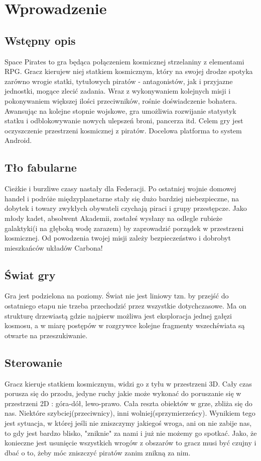 \chapter{Wprowadzenie}

\section{Wstępny opis}
Space Pirates to gra będąca połączeniem kosmicznej strzelaniny z elementami RPG. Gracz kierujew niej statkiem kosmicznym, który na swojej drodze spotyka zarówno wrogie statki, tytułowych piratów - antagonistów, jak i przyjazne jednostki, mogące zlecić zadania. Wraz z wykonywaniem kolejnych misji i pokonywaniem większej ilości przeciwników, rośnie doświadczenie bohatera. Awansując na kolejne stopnie wojskowe, gra umożliwia rozwijanie statystyk statku i odblokowywanie nowych ulepszeń broni, pancerza itd. Celem gry jest oczyszczenie przestrzeni kosmicznej z piratów. Docelowa platforma to system Android.

\section{Tło fabularne}
Cieżkie i burzliwe czasy nastały dla Federacji. Po ostatniej wojnie domowej handel i podróże międzyplanetarne stały się dużo bardziej niebezpieczne, na dobytek i towary zwykłych obywateli czychają piraci i grupy przestępcze. Jako młody kadet, absolwent Akademii, zostałeś wysłany na odlegle rubieże galaktyki(i na głęboką wodę zarazem) by zaprowadzić porządek w przestrzeni kosmicznej. Od powodzenia twojej misji zależy bezpieczeństwo i dobrobyt mieszkańców układów Carbona!

\section{Świat gry}
Gra jest podzielona na poziomy. Świat nie jest liniowy tzn. by przejść do ostatniego etapu nie trzeba przechodzić przez wszystkie dotychczasowe. Ma on strukturę drzewiastą gdzie najpierw możliwa jest eksploracja jednej gałęzi kosmosu, a w miarę postępów w rozgrywce kolejne fragmenty wszechświata są otwarte na przeszukiwanie.

\section{Sterowanie}
Gracz kieruje statkiem kosmicznym, widzi go z tyłu w przestrzeni 3D. Cały czas porusza się do przodu, jedyne ruchy jakie może wykonać do poruszanie się w przestrzeni 2D : góra-dół, lewo-prawo. Cała reszta obiektów w grze, zbliża się do nas. Niektóre szybciej(przeciwnicy), inni wolniej(sprzymierzeńcy). Wynikiem tego jest sytuacja, w której jeśli nie zniszczymy jakiegoś wroga, ani on nie zabije nas, to gdy jest bardzo blisko, "zniknie" za nami i już nie możemy go spotkać. Jako, że konieczne jest usunięcie wszystkich wrogów z obszarów to gracz musi być czujny i dbać o to, żeby móc zniszczyć piratów zanim znikną za nim.

